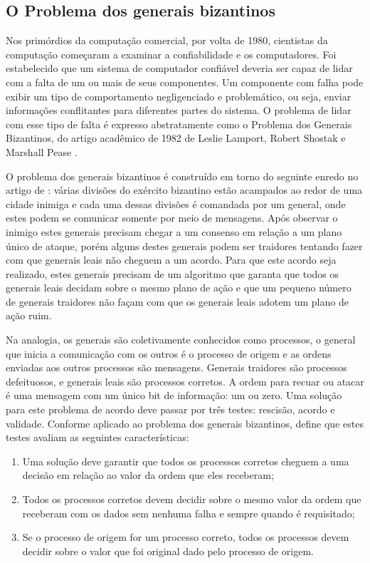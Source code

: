     \subsection{O Problema dos generais bizantinos}
    

           Nos primórdios da computação comercial, por volta de 1980, cientistas da computação começaram a examinar a confiabilidade e os computadores. Foi estabelecido que um sistema de computador confiável deveria ser capaz de lidar com a falta de um ou mais de seus componentes. Um componente com falha pode exibir um tipo de comportamento negligenciado e problemático, ou seja, enviar informações conflitantes para diferentes partes do sistema. O problema de lidar com esse tipo de falta é expresso abstratamente como o Problema dos Generais Bizantinos, do artigo acadêmico de 1982 de Leslie Lamport, Robert Shostak e Marshall Pease  \cite{blockchain_pratical_guide}.
           
           O problema dos generais bizantinos é construído em torno do seguinte enredo no artigo de : várias divisões do exército bizantino estão acampados ao redor de uma cidade inimiga e cada uma dessas divisões é comandada por um general, onde estes podem se comunicar somente por meio de mensagens. Após observar o inimigo estes generais precisam chegar a um consenso em relação a um plano único de ataque, porém alguns destes generais podem ser traidores tentando fazer com que generais leais não cheguem a um acordo. Para que este acordo seja realizado, estes generais precisam de um algoritmo que garanta que todos os generais leais decidam sobre o mesmo plano de ação e que um pequeno número de generais traidores não façam com que os generais leais adotem um plano de ação ruim.
           
            Na analogia, os generais são coletivamente conhecidos como processos, o general que inicia a comunicação com os outros é o processo de origem e as ordens enviadas aos outros processos são mensagens. Generais traidores são processos defeituosos, e generais leais são processos corretos. A ordem para recuar ou atacar é uma mensagem com um único bit de informação: um ou zero. Uma solução para este problema de acordo deve passar por três testes: rescisão, acordo e validade. Conforme aplicado ao problema dos generais bizantinos,  define que estes testes avaliam as seguintes características:
    
               \begin{enumerate}
                    \item Uma solução deve garantir que todos os processos corretos cheguem a uma decisão em relação ao valor da ordem que eles receberam;
                    \item Todos os processos corretos devem decidir sobre o mesmo valor da ordem que receberam com os dados sem nenhuma falha e sempre quando é requisitado;
                    \item Se o processo de origem for um processo correto, todos os processos devem decidir sobre o valor que foi original dado pelo processo de origem.
                \end{enumerate}
    
